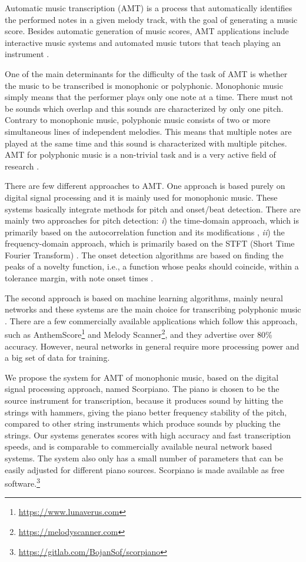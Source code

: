 \documentclass[conference]{IEEEtran}
\begin{document}
Automatic music transcription (AMT) is a process that automatically identifies the performed notes in a given melody track, with the goal of generating a music score.
Besides automatic generation of music scores, AMT applications include interactive music systems and automated music tutors that teach playing an instrument \cite{AMT:1, AMT:2}.

One of the main determinants for the difficulty of the task of AMT is whether the music to be transcribed is monophonic or polyphonic.
Monophonic music simply means that the performer plays only one note at a time. 
There must not be sounds which overlap and this sounds are characterized by only one pitch.
Contrary to monophonic music, polyphonic music consists of two or more simultaneous lines of independent melodies.
This means that multiple notes are played at the same time and this sound is characterized with multiple pitches.
AMT for polyphonic music is a non-trivial task and is a very active field of research \cite{AMT:2, AMTpoly:1, AMTpoly:2}.

There are few different approaches to AMT.
One approach is based purely on digital signal processing and it is mainly used for monophonic music. 
These systems basically integrate methods for pitch and onset/beat detection.
There are mainly two approaches for pitch detection: \emph{i}) the time-domain approach, which is primarily based on the autocorrelation function and its modifications \cite{PITCHm:1, YIN:1}, \emph{ii}) the frequency-domain approach, which is primarily based on the STFT (Short Time Fourier Transform) \cite{PITCHf:1}.
The onset detection algorithms are based on finding the peaks of a novelty function, i.e., a function whose peaks should coincide, within a tolerance margin, with note onset times \cite{ONSET:2}.

The second approach is based on machine learning algorithms, mainly neural networks and these systems are the main choice for transcribing polyphonic music \cite{AMTML:1}.
There are a few commercially available applications which follow this approach, such as AnthemScore\footnote{\url{https://www.lunaverus.com}} and Melody Scanner\footnote{\url{https://melodyscanner.com}}, and they advertise over 80\% accuracy.
However, neural networks in general require more processing power and a big set of data for training.

We propose the system for AMT of monophonic music, based on the digital signal processing approach, named Scorpiano.
The piano is chosen to be the source instrument for transcription, because it produces sound by hitting the strings with hammers, giving the piano better frequency stability of the pitch, compared to other string instruments which produce sounds by plucking the strings.
Our systems generates scores with high accuracy and fast transcription speeds, and is comparable to commercially available neural network based systems.
The system also only has a small number of parameters that can be easily adjusted for different piano sources.
Scorpiano is made available as free software.\footnote{\url{https://gitlab.com/BojanSof/scorpiano}}
\end{document}
